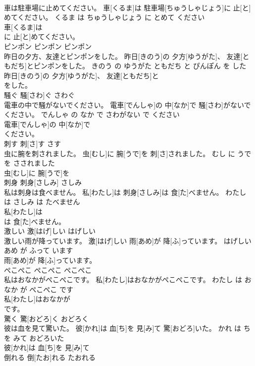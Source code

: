 \documentclass[8pt]{extreport}
\begin{document}
\begin{CJK}{UTF8}{min}
\\	車は駐車場に止めてください。	車[くるま]は 駐車場[ちゅうしゃじょう]に 止[と]めてください。	くるま は ちゅうしゃじょう に とめて ください	
\\	車[くるま]は
\\	に 止[と]めてください。			
\\	ピンポン	ピンポン	ピンポン	
\\	昨日の夕方、友達とピンポンをした。	昨日[きのう]の 夕方[ゆうがた]、 友達[ともだち]とピンポンをした。	きのう の ゆうがた ともだち と ぴんぽん を した	
\\	昨日[きのう]の 夕方[ゆうがた]、 友達[ともだち]と
\\	をした。			
\\	騒ぐ	騒[さわ]ぐ	さわぐ	
\\	電車の中で騒がないでください。	電車[でんしゃ]の 中[なか]で 騒[さわ]がないでください。	でんしゃ の なか で さわがない で ください	
\\	電車[でんしゃ]の 中[なか]で
\\	ください。			
\\	刺す	刺[さ]す	さす	
\\	虫に腕を刺されました。	虫[むし]に 腕[うで]を 刺[さ]されました。	むし に うで を さされました	
\\	虫[むし]に 腕[うで]を
\\	刺身	刺身[さしみ]	さしみ	
\\	私は刺身は食べません。	私[わたし]は 刺身[さしみ]は 食[た]べません。	わたし は さしみ は たべません	
\\	私[わたし]は
\\	は 食[た]べません。			
\\	激しい	激[はげ]しい	はげしい	
\\	激しい雨が降っています。	激[はげ]しい 雨[あめ]が 降[ふ]っています。	はげしい あめ が ふって います	
\\	雨[あめ]が 降[ふ]っています。			
\\	ぺこぺこ	ぺこぺこ	ぺこぺこ	
\\	私はおなかがぺこぺこです。	私[わたし]はおなかがぺこぺこです。	わたし は おなか が ぺこぺこ です	
\\	私[わたし]はおなかが
\\	です。			
\\	驚く	驚[おどろ]く	おどろく	
\\	彼は血を見て驚いた。	彼[かれ]は 血[ち]を 見[み]て 驚[おどろ]いた。	かれ は ち を みて おどろいた	
\\	彼[かれ]は 血[ち]を 見[み]て
\\	倒れる	倒[たお]れる	たおれる	

\end{CJK}
\end{document}
